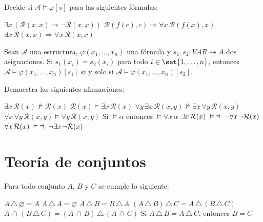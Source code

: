 \documentclass[fc]{tarea}
\newcommand{\mturnstile}[2]{\mathrel{\vDash\rotatebox[origin=c]{180}{$\vDash$}_{#1}^{#2}}}
\begin{document}
\begin{exercise}
    Decide si $\mathscr{A} \vDash \varphi[s]$ para las siguientes fórmulas:

\begin{tasks}
    \task $\exists x \, (\mathcal{R}(x, x) \Rightarrow \neg \mathcal{R}(x, x))$
    \task $\mathcal{R}(f(c), c) \Rightarrow \forall x \, \mathcal{R}(f(x), x)$
    \task $\exists x \, \mathcal{R}(x, x) \Rightarrow \forall x \, \mathcal{R}(x, x)$
\end{tasks}
\end{exercise}

\begin{exercise}
    Sean $\mathscr{A}$ una estructura, $\varphi(x_1, \dots, x_n)$ una fórmula y $s_1, s_2 : VAR \to A$ dos asignaciones. Si $s_1(x_i) = s_2(x_i)$
    para todo $i \in \set{1, \dots, n}$, entonces $\mathscr{A} \vDash \varphi(x_1, \dots, x_n)[s_1]$ si y solo si 
    $\mathscr{A} \vDash \varphi(x_1, \dots, x_n)[s_2]$.
\end{exercise}

\begin{exercise}
    Demuestra las siguientes afirmaciones:

\begin{tasks}
    \task $\exists x \, \mathcal{R}(x) \nvDash \mathcal{R}(x)$
    \task $\mathcal{R}(x) \vDash \exists x \, \mathcal{R}(x)$
    \task $\forall y \, \exists x \, \mathcal{R}(x, y) \nvDash \exists x \, \forall y \, \mathcal{R}(x, y)$
    \task $\forall x \, \forall y \, \mathcal{R}(x, y) \vDash \forall y \, \mathcal{R}(x, y)$
    \task Si $\vDash \alpha$ entonces $\vDash \forall x \, \alpha$
    \task $\exists x \, \mathcal{R}(x)\; \mturnstile{}{}\; \neg \forall x \, \neg \mathcal{R}(x)$
    \task $\forall x \, \mathcal{R}(x)\; \mturnstile{}{}\; \neg \exists x \, \neg \mathcal{R}(x)$
\end{tasks}

\end{exercise}

\chapter*{Teoría de conjuntos}

\begin{exercise}
    Para todo conjunto $A$, $B$ y $C$ se cumple lo siguiente:
    \begin{tasks}
    \task $A\, \triangle\, \varnothing = A$
    \task $A\, \triangle\, A = \varnothing$
    \task $A\, \triangle\, B = B\, \triangle\, A$
    \task $(A\, \triangle\, B)\, \triangle\, C = A\, \triangle\, (B\, \triangle\, C)$
    \task $A\, \cap\, (B\, \triangle\, C) = (A\, \cap\, B)\, \triangle\, (A\, \cap\, C) $
    \task Si $A\, \triangle\, B = A\, \triangle\, C$, entonces $B = C$
    \end{tasks}
\end{exercise}
\end{document}
